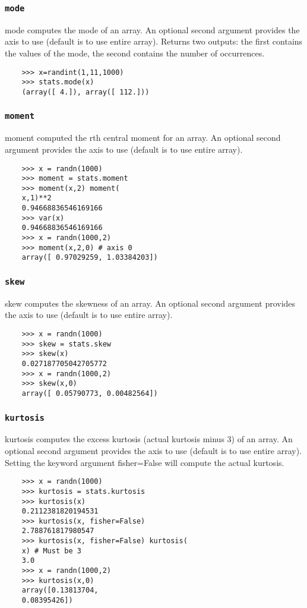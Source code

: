 \documentclass[KSmain.tex]{subfiles}
\begin{document}
\subsubsection*{\texttt{mode}}
mode computes the mode of an array. An optional second argument provides the axis to use (default is to
use entire array). Returns two outputs: the first contains the values of the mode, the second contains the
number of occurrences.
\begin{framed}
	\begin{verbatim}
	>>> x=randint(1,11,1000)
	>>> stats.mode(x)
	(array([ 4.]), array([ 112.]))
	\end{verbatim}
\end{framed}
\subsubsection*{\texttt{moment}}
moment computed the rth central moment for an array. An optional second argument provides the axis to
use (default is to use entire array).
\begin{framed}
	\begin{verbatim}
	>>> x = randn(1000)
	>>> moment = stats.moment
	>>> moment(x,2) moment(
	x,1)**2
	0.94668836546169166
	>>> var(x)
	0.94668836546169166
	>>> x = randn(1000,2)
	>>> moment(x,2,0) # axis 0
	array([ 0.97029259, 1.03384203])
	\end{verbatim}
\end{framed}
\subsubsection*{\texttt{skew}}
skew computes the skewness of an array. An optional second argument provides the axis to use (default is
to use entire array).
\begin{framed}
	\begin{verbatim}
	>>> x = randn(1000)
	>>> skew = stats.skew
	>>> skew(x)
	0.027187705042705772
	>>> x = randn(1000,2)
	>>> skew(x,0)
	array([ 0.05790773, 0.00482564])
	\end{verbatim}
\end{framed}
\subsubsection*{\texttt{kurtosis}}
kurtosis computes the excess kurtosis (actual kurtosis minus 3) of an array. An optional second argument
provides the axis to use (default is to use entire array). Setting the keyword argument fisher=False will
compute the actual kurtosis.
\begin{framed}
	\begin{verbatim}
	>>> x = randn(1000)
	>>> kurtosis = stats.kurtosis
	>>> kurtosis(x)
	0.2112381820194531
	>>> kurtosis(x, fisher=False)
	2.788761817980547
	>>> kurtosis(x, fisher=False) kurtosis(
	x) # Must be 3
	3.0
	>>> x = randn(1000,2)
	>>> kurtosis(x,0)
	array([0.13813704,
	0.08395426])
	\end{verbatim}
\end{framed}
\end{document}

